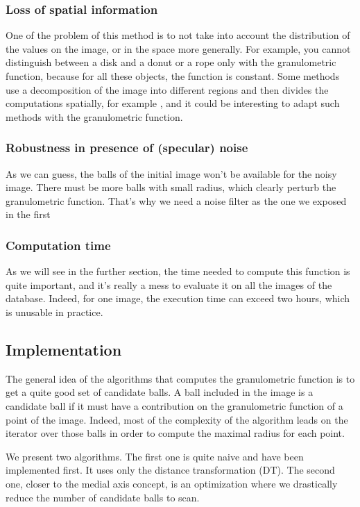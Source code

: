 \subsubsection{Loss of spatial information}

One of the problem of this method is to not take into account the distribution of the values on the image, or in the space more generally. For example, you cannot distinguish between a disk and a donut or a rope only with the granulometric function, because for all these objects, the function is constant. Some methods use a decomposition of the image into different regions and then divides the computations spatially, for example \cite{spacial-decompo}, and it could be interesting to adapt such methods with the granulometric function.

\subsubsection{Robustness in presence of (specular) noise}

As we can guess, the balls of the initial image won't be available for the noisy image. There must be more balls with small radius, which clearly perturb the granulometric function. That's why we need a noise filter as the one we exposed in the first 

\subsubsection{Computation time}

As we will see in the further section, the time needed to compute this function is quite important, and it's really a mess to evaluate it on all the images of the database. Indeed, for one image, the execution time can exceed two hours, which is unusable in practice.

\subsection{Implementation}

The general idea of the algorithms that computes the granulometric function is to get a quite good set of candidate balls. A ball included in the image is a candidate ball if it must have a contribution on the granulometric function of a point of the image. Indeed, most of the complexity of the algorithm leads on the iterator over those balls in order to compute the maximal radius for each point. 

We present two algorithms. The first one is quite naive and have been implemented first. It uses only the distance transformation (DT). The second one, closer to the medial axis concept, is an optimization where we drastically reduce the number of candidate balls to scan.


